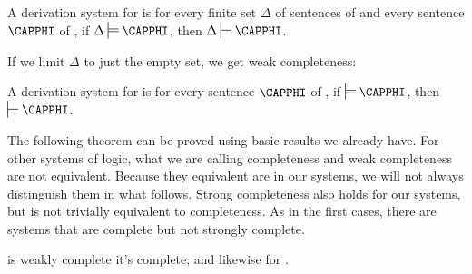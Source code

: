 \begin{majorILnc}{}
	A derivation system  for  is  \Iff for every finite set $\Delta$ of sentences of  and every sentence $\CAPPHI$ of , if $\Delta\sdtstile{}{}\CAPPHI$, then $\Delta\sststile{}{}\CAPPHI$.
\end{majorILnc} 
\noindent{}If we limit $\Delta$ to just the empty set, we get weak completeness:
\begin{majorILnc}{}
	A derivation system  for  is  \Iff for every sentence $\CAPPHI$ of , if $\sdtstile{}{}\CAPPHI$, then $\sststile{}{}\CAPPHI$.
\end{majorILnc} 
\noindent{}The following theorem can be proved using basic results we already have.  For other systems of logic, what we are calling completeness and weak completeness are not equivalent.  Because they equivalent are in our systems, we will not always distinguish them in what follows.  Strong completeness also holds for our systems, but is not trivially equivalent to completeness.  As in the first cases, there are systems that are complete but not strongly complete.
\begin{THEOREM}{}
	\GSD{} is weakly complete \Iff it's complete; and likewise for \GQD{}.
\end{THEOREM}
